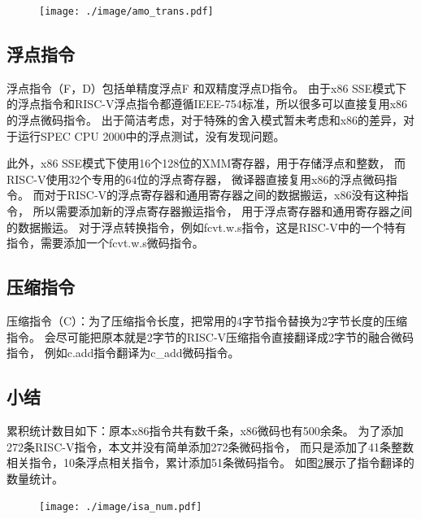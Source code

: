 \begin{figure}[!htbp]
  \centering
  \texttt{[image: ./image/amo\_trans.pdf]}
  \label{img:amo_trans}
\end{figure}

\subsection{浮点指令}
浮点指令（F，D）包括单精度浮点F 和双精度浮点D指令。
由于x86 SSE模式下的浮点指令和RISC-V浮点指令都遵循IEEE-754标准，所以很多可以直接复用x86的浮点微码指令。
出于简洁考虑，对于特殊的舍入模式暂未考虑和x86的差异，对于运行SPEC CPU 2000中的浮点测试，没有发现问题。

此外，x86 SSE模式下使用16个128位的XMM寄存器，用于存储浮点和整数，
而RISC-V使用32个专用的64位的浮点寄存器，
微译器直接复用x86的浮点微码指令。
而对于RISC-V的浮点寄存器和通用寄存器之间的数据搬运，x86没有这种指令，
所以需要添加新的浮点寄存器搬运指令，
用于浮点寄存器和通用寄存器之间的数据搬运。
对于浮点转换指令，例如fcvt.w.s指令，这是RISC-V中的一个特有指令，需要添加一个fcvt.w.s微码指令。

\subsection{压缩指令}
压缩指令（C）：为了压缩指令长度，把常用的4字节指令替换为2字节长度的压缩指令。
会尽可能把原本就是2字节的RISC-V压缩指令直接翻译成2字节的融合微码指令，
例如c.add指令翻译为c\_add微码指令。



\subsection{小结}

累积统计数目如下：原本x86指令共有数千条，x86微码也有500余条。
为了添加272条RISC-V指令，本文并没有简单添加272条微码指令，
而只是添加了41条整数相关指令，10条浮点相关指令，累计添加51条微码指令。
如图\ref{img:isa_num}展示了指令翻译的数量统计。


\begin{figure}[!htbp]
  \centering
  \texttt{[image: ./image/isa\_num.pdf]}
  \label{img:isa_num}
\end{figure}

